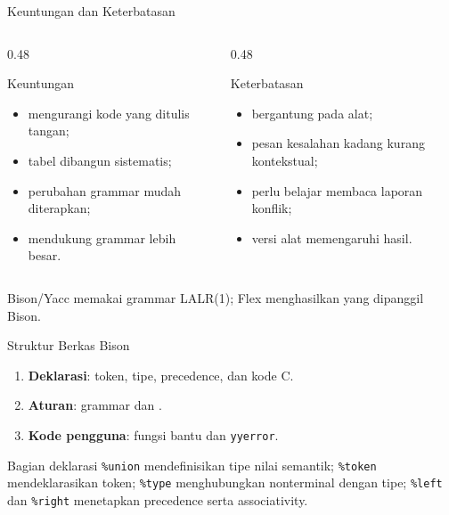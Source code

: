 \documentclass[aspectratio=169,10pt,t]{beamer}
\begin{document}
\begin{frame}{Keuntungan dan Keterbatasan}
  \begin{columns}[T,onlytextwidth]
    \begin{column}{0.48\textwidth}
      \begin{block}{Keuntungan}
        \footnotesize
        \begin{itemize}
          \item mengurangi kode yang ditulis tangan;
          \item tabel dibangun sistematis;
          \item perubahan grammar mudah diterapkan;
          \item mendukung grammar lebih besar.
        \end{itemize}
      \end{block}
    \end{column}
    \begin{column}{0.48\textwidth}
      \begin{block}{Keterbatasan}
        \footnotesize
        \begin{itemize}
          \item bergantung pada alat;
          \item pesan kesalahan kadang kurang kontekstual;
          \item perlu belajar membaca laporan konflik;
          \item versi alat memengaruhi hasil.
        \end{itemize}
      \end{block}
    \end{column}
  \end{columns}

  \vspace{4pt}
  {\footnotesize\color{ubbblue!80}Bison/Yacc memakai grammar LALR(1);
  Flex menghasilkan  yang dipanggil Bison.}
\end{frame}

\begin{frame}{Struktur Berkas Bison}
  \begin{enumerate}
    \setlength{\itemsep}{3pt}
    \item \textbf{Deklarasi}: token, tipe, precedence, dan kode C.
    \item \textbf{Aturan}: grammar dan .
    \item \textbf{Kode pengguna}: fungsi bantu dan
          \texttt{yyerror}.
  \end{enumerate}

  \vspace{4pt}
  \begin{block}{Bagian deklarasi}
    \footnotesize
    \texttt{\%union} mendefinisikan tipe nilai semantik;
    \texttt{\%token} mendeklarasikan token; \texttt{\%type}
    menghubungkan nonterminal dengan tipe; \texttt{\%left} dan
    \texttt{\%right} menetapkan precedence serta associativity.
  \end{block}
\end{frame}
\end{document}
